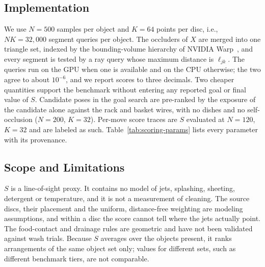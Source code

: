 \subsection{Implementation}
\label{sec:scoring-impl}

We use $N=500$ samples per object and $K=64$ points per disc, i.e., $NK=32{,}000$ segment queries per object.
The occluders of $X$ are merged into one triangle set, indexed by the bounding-volume hierarchy of NVIDIA Warp~\cite{macklin2022warp}, and every segment is tested by a ray query whose maximum distance is $\ell_{jk}$.
The queries run on the GPU when one is available and on the CPU otherwise; the two agree to about $10^{-6}$, and we report scores to three decimals.
Two cheaper quantities support the benchmark without entering any reported goal or final value of $S$.
Candidate poses in the goal search are pre-ranked by the exposure of the candidate alone against the rack and basket wires, with no dishes and no self-occlusion ($N=200$, $K=32$).
Per-move score traces are $S$ evaluated at $N=120$, $K=32$ and are labeled as such.
Table~\ref{tab:scoring-params} lists every parameter with its provenance.

\subsection{Scope and Limitations}
\label{sec:scoring-limits}

$S$ is a line-of-sight proxy.
It contains no model of jets, splashing, sheeting, detergent or temperature, and it is not a measurement of cleaning.
The source discs, their placement and the uniform, distance-free weighting are modeling assumptions, and within a disc the score cannot tell where the jets actually point.
The food-contact and drainage rules are geometric and have not been validated against wash trials.
Because $S$ averages over the objects present, it ranks arrangements of the same object set only; values for different sets, such as different benchmark tiers, are not comparable.
